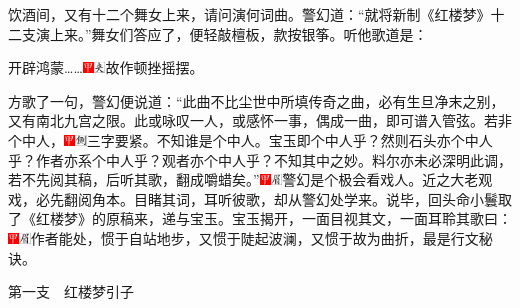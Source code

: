 饮酒间，又有十二个舞女上来，请问演何词曲。警幻道：“就将新制《红楼梦》十二支演上来。”舞女们答应了，便轻敲檀板，款按银筝。听他歌道是：

开辟鸿蒙\ldots{}\ldots{}{\includegraphics[width=3mm]{../Images/00002}\includegraphics[width=3mm]{../Images/00012}\footnotesize \kaishu 故作顿挫摇摆。}

方歌了一句，警幻便说道：“此曲不比尘世中所填传奇之曲，必有生旦净末之别，又有南北九宫之限。此或咏叹一人，或感怀一事，偶成一曲，即可谱入管弦。若非个中人，{\includegraphics[width=3mm]{../Images/00002}\includegraphics[width=3mm]{../Images/00011}\footnotesize \kaishu 三字要紧。不知谁是个中人。宝玉即个中人乎？然则石头亦个中人乎？作者亦系个中人乎？观者亦个中人乎？}不知其中之妙。料尔亦未必深明此调，若不先阅其稿，后听其歌，翻成嚼蜡矣。”{\includegraphics[width=3mm]{../Images/00002}\includegraphics[width=3mm]{../Images/00010}\footnotesize \kaishu 警幻是个极会看戏人。近之大老观戏，必先翻阅角本。目睹其词，耳听彼歌，却从警幻处学来。}说毕，回头命小鬟取了《红楼梦》的原稿来，递与宝玉。宝玉揭开，一面目视其文，一面耳聆其歌曰：{\includegraphics[width=3mm]{../Images/00002}\includegraphics[width=3mm]{../Images/00010}\footnotesize \kaishu 作者能处，惯于自站地步，又惯于陡起波澜，又惯于故为曲折，最是行文秘诀。}

第一支　红楼梦引子

